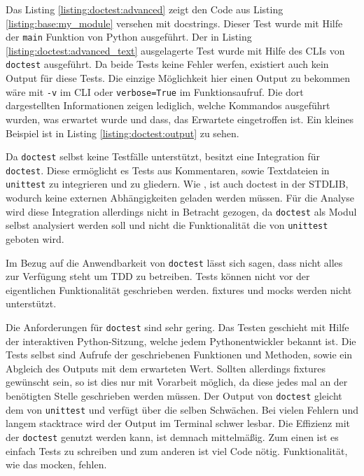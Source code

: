 Das Listing \ref{listing:doctest:advanced} zeigt den Code aus Listing
\ref{listing:base:my_module} versehen mit \Glspl{docstring}. Dieser Test wurde
mit Hilfe der \lstinline{main} Funktion von Python ausgeführt. Der in Listing
\ref{listing:doctest:advanced_text} ausgelagerte Test wurde mit Hilfe des CLIs
von \lstinline{doctest} ausgeführt. Da beide Tests keine Fehler werfen, 
existiert auch kein Output für diese Tests.
Die einzige Möglichkeit hier einen Output zu bekommen wäre mit \lstinline{-v} im
CLI oder \lstinline{verbose=True} im Funktionsaufruf. Die dort dargestellten
Informationen zeigen lediglich, welche Kommandos ausgeführt wurden, was erwartet
wurde und dass, das Erwartete eingetroffen ist. Ein kleines Beispiel ist in
Listing \ref{listing:doctest:output} zu sehen.

Da \lstinline{doctest} selbst keine Testfälle unterstützt, besitzt
 eine Integration für \lstinline{doctest}.
Diese ermöglicht es Tests aus Kommentaren, sowie Textdateien in
\lstinline{unittest} zu integrieren und zu gliedern. Wie
, ist auch doctest in der STDLIB, wodurch keine
externen Abhängigkeiten geladen werden müssen. Für die Analyse wird diese 
Integration allerdings nicht in Betracht gezogen, da \lstinline{doctest} als 
Modul selbst analysiert werden soll und nicht die Funktionalität die von 
\lstinline{unittest} geboten wird.
\newline

Im Bezug auf die Anwendbarkeit von \lstinline{doctest} lässt sich sagen, dass
nicht alles zur Verfügung steht um TDD zu betreiben. Tests können nicht vor der
eigentlichen Funktionalität geschrieben werden. \Glspl{fixture} und 
\Glspl{mock} werden nicht unterstützt.

Die Anforderungen für \lstinline{doctest} sind sehr gering. Das Testen geschieht
mit Hilfe der interaktiven Python-Sitzung, welche jedem Pythonentwickler
bekannt ist. Die Tests selbst sind Aufrufe der geschriebenen Funktionen und
Methoden, sowie ein Abgleich des Outputs mit dem erwarteten Wert. Sollten
allerdings \Glspl{fixture} gewünscht sein, so ist dies nur mit Vorarbeit
möglich, da diese jedes mal an der benötigten Stelle geschrieben werden müssen.
Der Output von \lstinline{doctest} gleicht dem von \lstinline{unittest} und
verfügt über die selben Schwächen. Bei vielen Fehlern und langem
\gls{stacktrace} wird der Output im Terminal schwer lesbar. Die Effizienz mit
der \lstinline{doctest} genutzt werden kann, ist demnach mittelmäßig. Zum einen
ist es einfach Tests zu schreiben und zum anderen ist viel Code nötig.
Funktionalität, wie das \gls{mock}en, fehlen.

